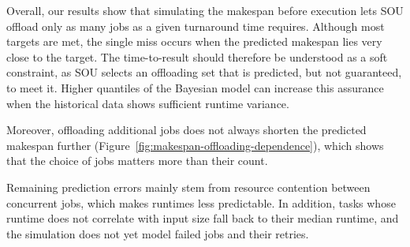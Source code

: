 Overall, our results show that simulating the makespan before execution lets SOU offload only as many jobs as a given turnaround time requires. Although most targets are met, the single miss occurs when the predicted makespan lies very close to the target. The time-to-result should therefore be understood as a soft constraint, as SOU selects an offloading set that is predicted, but not guaranteed, to meet it. Higher quantiles of the Bayesian model can increase this assurance when the historical data shows sufficient runtime variance. 

Moreover, offloading additional jobs does not always shorten the predicted makespan further (Figure~\ref{fig:makespan-offloading-dependence}), which shows that the choice of jobs matters more than their count. 

Remaining prediction errors mainly stem from resource contention between concurrent jobs, which makes runtimes less predictable. In addition, tasks whose runtime does not correlate with input size fall back to their median runtime, and the simulation does not yet model failed jobs and their retries.